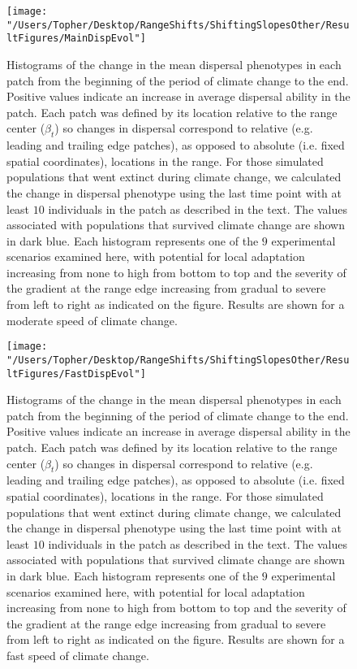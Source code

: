 \documentclass[12pt, oneside]{article}
\begin{document}
\begin{figure}
\centering
\texttt{[image: "/Users/Topher/Desktop/RangeShifts/ShiftingSlopesOther/ResultFigures/MainDispEvol"]}
\vspace{-5mm}
\caption[LoF entry]{Histograms of the change in the mean dispersal phenotypes in each patch from the beginning of the period of climate change to the end. Positive values indicate an increase in average dispersal ability in the patch. Each patch was defined by its location relative to the range center ($\beta_{t}$) so changes in dispersal correspond to relative (e.g. leading and trailing edge patches), as opposed to absolute (i.e. fixed spatial coordinates), locations in the range.  For those simulated populations that went extinct during climate change, we calculated the change in dispersal phenotype using the last time point with at least $10$ individuals in the patch as described in the text. The values associated with populations that survived climate change are shown in dark blue. Each histogram represents one of the $9$ experimental scenarios examined here, with potential for local adaptation increasing from none to high from bottom to top and the severity of the gradient at the range edge increasing from gradual to severe from left to right as indicated on the figure. Results are shown for a moderate speed of climate change.}
\label{fig:DispEvolMain}
\end{figure}

\begin{figure}
\centering
\texttt{[image: "/Users/Topher/Desktop/RangeShifts/ShiftingSlopesOther/ResultFigures/FastDispEvol"]}
\vspace{-5mm}
\caption[LoF entry]{Histograms of the change in the mean dispersal phenotypes in each patch from the beginning of the period of climate change to the end. Positive values indicate an increase in average dispersal ability in the patch. Each patch was defined by its location relative to the range center ($\beta_{t}$) so changes in dispersal correspond to relative (e.g. leading and trailing edge patches), as opposed to absolute (i.e. fixed spatial coordinates), locations in the range.  For those simulated populations that went extinct during climate change, we calculated the change in dispersal phenotype using the last time point with at least $10$ individuals in the patch as described in the text. The values associated with populations that survived climate change are shown in dark blue. Each histogram represents one of the $9$ experimental scenarios examined here, with potential for local adaptation increasing from none to high from bottom to top and the severity of the gradient at the range edge increasing from gradual to severe from left to right as indicated on the figure. Results are shown for a fast speed of climate change.}
\label{fig:DispEvolFast}
\end{figure}
\end{document}
